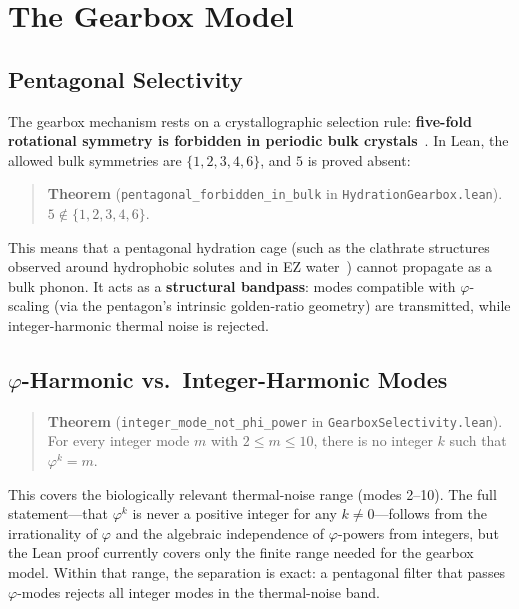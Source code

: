 \documentclass[11pt,twocolumn]{article}
\begin{document}
\section{The Gearbox Model}

\subsection{Pentagonal Selectivity}

The gearbox mechanism rests on a crystallographic selection rule:
\textbf{five-fold rotational symmetry is forbidden in periodic bulk
crystals}~\cite{Shechtman1984}. In Lean, the allowed bulk symmetries are
$\{1, 2, 3, 4, 6\}$, and $5$ is proved absent:

\begin{quote}
\textbf{Theorem} (\texttt{pentagonal\_forbidden\_in\_bulk} in
\texttt{HydrationGearbox.lean}).
$5 \notin \{1, 2, 3, 4, 6\}$.
\end{quote}

This means that a pentagonal hydration cage (such as the clathrate
structures observed around hydrophobic solutes and in EZ
water~\cite{Pollack2013}) cannot propagate as a bulk phonon. It acts as a
\textbf{structural bandpass}: modes compatible with $\varphi$-scaling (via
the pentagon's intrinsic golden-ratio geometry) are transmitted, while
integer-harmonic thermal noise is rejected.

\subsection{$\varphi$-Harmonic vs.\ Integer-Harmonic Modes}

\begin{quote}
\textbf{Theorem} (\texttt{integer\_mode\_not\_phi\_power} in
\texttt{GearboxSelectivity.lean}).
For every integer mode $m$ with $2 \leq m \leq 10$, there is no integer
$k$ such that $\varphi^k = m$.
\end{quote}

This covers the biologically relevant thermal-noise range (modes 2--10).
The full statement---that $\varphi^k$ is never a positive integer for any
$k \neq 0$---follows from the irrationality of $\varphi$ and the
algebraic independence of $\varphi$-powers from integers, but the Lean
proof currently covers only the finite range needed for the gearbox model.
Within that range, the separation is exact: a pentagonal filter that passes
$\varphi$-modes rejects all integer modes in the thermal-noise band.
\end{document}

